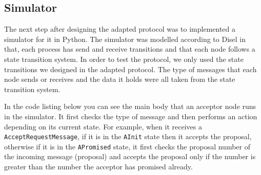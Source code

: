 %
%

\subsection{Simulator}
The next step after designing the adapted protocol was to
implemented a simulator for it in Python. The simulator was modelled according
to Disel in that, each process has send and receive transitions and that each
node follows a state transition system. In order to test the protocol, we only
used the state transitions we designed in the adapted protocol. The type
of messages that each node sends or receives and the data it holds
were all taken from the state transition system.

In the code listing below you can see the main body that an acceptor node
runs in the simulator. It first checks the type of message and then performs
an action depending on its current state. For example, when it receives a
\texttt{AcceptRequestMessage}, if it is in the \texttt{AInit} state then it
accepts the proposal, otherwise if it is in the \texttt{APromised} state, it
first checks the proposal number of the incoming message (proposal)
and accepts the proposal only if the number is greater than the number
the acceptor has promised already.

